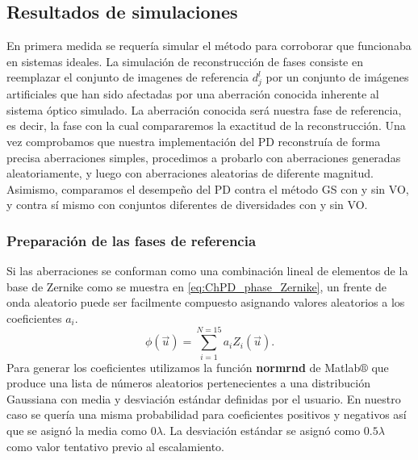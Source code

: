 \subsection{Resultados de simulaciones}
En primera medida se requería simular el método para corroborar que
funcionaba en sistemas ideales. La simulación de reconstrucción de
fases consiste en reemplazar el conjunto de imagenes de referencia $d_j^l$ por un
conjunto de imágenes artificiales que han sido afectadas por una
aberración conocida inherente al sistema
óptico simulado. La aberración conocida será nuestra fase de
referencia, es decir, la fase con la cual compararemos la exactitud de
la reconstrucción. 
Una vez comprobamos que nuestra implementación del PD reconstruía de
forma precisa aberraciones simples, procedimos a probarlo con
aberraciones generadas aleatoriamente, y luego con aberraciones aleatorias de
diferente magnitud. Asimismo, comparamos el desempeño del PD contra el
método GS con y sin VO, y contra sí mismo con conjuntos diferentes de
diversidades con y sin VO.  

\subsubsection{Preparación de las fases de referencia}

Si las aberraciones se conforman como una combinación lineal de
elementos de la base de Zernike como se muestra en
\ref{eq:ChPD_phase_Zernike}, un frente de onda aleatorio puede ser
facilmente compuesto asignando valores aleatorios a los coeficientes $a_i$. 
\begin{equation}
\label{eq:ChPD_phase_Zernike}
\phi(\vec{u}) = \sum_{i=1}^{N=15}a_iZ_i(\vec{u}). 
\end{equation}
Para generar los coeficientes utilizamos la función \textbf{normrnd}
de Matlab$\circledR$ que produce una lista de números aleatorios pertenecientes
 a una distribución Gaussiana con media y desviación
estándar definidas por el usuario.  En nuestro caso se quería una
misma probabilidad para coeficientes positivos y negativos así que se asignó la media
como $0\lambda$. La desviación estándar se asignó como $0.5\lambda$ como valor
tentativo previo al escalamiento. 

